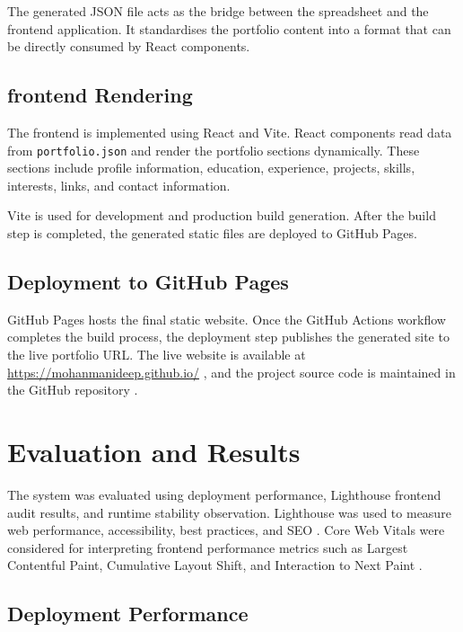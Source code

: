 \documentclass[10pt,a4paper,twocolumn]{article}
\begin{document}
The generated JSON file acts as the bridge between the spreadsheet and the frontend application. It standardises the portfolio content into a format that can be directly consumed by React components.

\subsection{frontend Rendering}

The frontend is implemented using React and Vite. React components read data from \texttt{portfolio.json} and render the portfolio sections dynamically. These sections include profile information, education, experience, projects, skills, interests, links, and contact information.

Vite is used for development and production build generation. After the build step is completed, the generated static files are deployed to GitHub Pages.

\subsection{Deployment to GitHub Pages}

GitHub Pages hosts the final static website. Once the GitHub Actions workflow completes the build process, the deployment step publishes the generated site to the live portfolio URL. The live website is available at \url{https://mohanmanideep.github.io/} \cite{portfolioWebsite}, and the project source code is maintained in the GitHub repository \cite{portfolioRepository}.

\section{Evaluation and Results}

The system was evaluated using deployment performance, Lighthouse frontend audit results, and runtime stability observation. Lighthouse was used to measure web performance, accessibility, best practices, and SEO \cite{lighthouseDocs}. Core Web Vitals were considered for interpreting frontend performance metrics such as Largest Contentful Paint, Cumulative Layout Shift, and Interaction to Next Paint \cite{coreWebVitalsDocs}.

\subsection{Deployment Performance}
\end{document}
